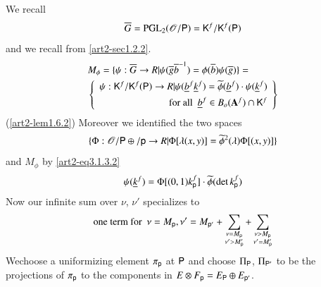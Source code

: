 We recall
$$
\overline{G}=\mathrm{PGL}_{2}(\mathscr{O}/\mathsf{P})=\mathsf{K}^{f}/\mathsf{K}^{f}(\mathsf{P})
$$
and we recall from \ref{art2-sec1.2.2}.
\begin{align*}
& M_{\phi}=\{\psi:\overline{G}\to R|\psi(\overline{g}\overline{b}^{-1})=\phi(\overline{b})\psi(\overline{g})\}=\\
&\left\{
\begin{array}{r}
\psi : \mathsf{K}^{f}/\mathsf{K}^{f}(\mathsf{P})\to R|\psi(\underline{b}^{f}\underline{k}^{f})=\widetilde{\phi}(\underline{b}^{f})\cdot \psi(\underline{k}^{f})\\[4pt]
\text{for all~ } \underline{b}^{f}\in B_{o}(\mathbf{A}^{f})\cap \mathsf{K}^{f}
\end{array}
\right\}
\end{align*}
(\ref{art2-lem1.6.2}) Moreover we identified the two spaces
$$
\{\Phi:\mathscr{O}/\mathsf{P}\oplus /\mathsf{p}\to R|\Phi[\lambda(x,y)]=\widetilde{\phi}^{2}(\lambda)\Phi[(x,y)]\}
$$
and $M_{\phi}$ by \eqref{art2-eq3.1.3.2}
$$
\psi(\underline{k}^{f})=\Phi[(0,1)k^{f}_{\mathsf{p}}]\cdot \widetilde{\phi}(\det k^{f}_{\mathsf{p}})
$$
Now our infinite sum over $\nu$, $\nu'$ specializes to 
$$
\text{one term for~ } \nu=M_{\mathsf{p}}, \nu'=M_{\mathsf{p}'}+\sum\limits_{\substack{\nu=M_{\mathsf{p}}\\ \nu'>M'_{\mathsf{p}}}}+\sum\limits_{\substack{\nu>M_{\mathsf{p}}\\ \nu'=M'_{\mathsf{p}}}}
$$
We\pageoriginale choose a uniformizing element $\pi_{\mathsf{p}}$ at $\mathsf{P}$ and choose $\Pi_{\mathsf{P}}$, $\Pi_{\mathsf{P}'}$ to be the projections of $\pi_{\mathsf{p}}$ to the components in $E\otimes F_{\mathsf{p}}=E_{\mathsf{P}}\oplus E_{\mathsf{p}'}$.

